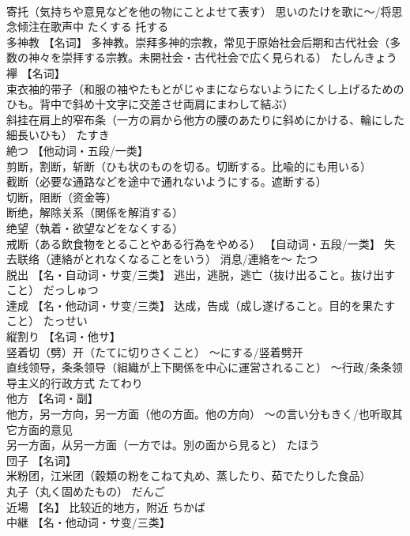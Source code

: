 \documentclass[8pt]{extreport}
\begin{document}
\begin{CJK}{UTF8}{min}
\\	寄托（気持ちや意見などを他の物にことよせて表す） 思いのたけを歌に～/将思念倾注在歌声中	たくする	托する
\\	多神教	【名词】 多神教。崇拜多神的宗教，常见于原始社会后期和古代社会（多数の神々を崇拝する宗教。未開社会・古代社会で広く見られる）	たしんきょう	
\\	襷	【名词】 
\\	束衣袖的带子（和服の袖やたもとがじゃまにならないようにたくし上げるためのひも。背中で斜め十文字に交差させ両肩にまわして結ぶ） 
\\	斜挂在肩上的窄布条（一方の肩から他方の腰のあたりに斜めにかける、輪にした細長いひも）	たすき	
\\	絶つ	【他动词・五段/一类】 
\\	剪断，割断，斩断（ひも状のものを切る。切断する。比喩的にも用いる） 
\\	截断（必要な通路などを途中で通れないようにする。遮断する） 
\\	切断，阻断（资金等） 
\\	断绝，解除关系（関係を解消する） 
\\	绝望（執着・欲望などをなくする） 
\\	戒断（ある飲食物をとることやある行為をやめる） 【自动词・五段/一类】 失去联络（連絡がとれなくなることをいう） 消息/連絡を～	たつ	
\\	脱出	【名・自动词・サ变/三类】 逃出，逃脱，逃亡（抜け出ること。抜け出すこと）	だっしゅつ	
\\	達成	【名・他动词・サ变/三类】 达成，告成（成し遂げること。目的を果たすこと）	たっせい	
\\	縦割り	【名词・他サ】 
\\	竖着切（劈）开（たてに切りさくこと） ～にする/竖着劈开 
\\	直线领导，条条领导（組織が上下関係を中心に運営されること） ～行政/条条领导主义的行政方式	たてわり	
\\	他方	【名词・副】 
\\	他方，另一方向，另一方面（他の方面。他の方向） ～の言い分もきく/也听取其它方面的意见 
\\	另一方面，从另一方面（一方では。別の面から見ると）	たほう	
\\	団子	【名词】 
\\	米粉团，江米团（穀類の粉をこねて丸め、蒸したり、茹でたりした食品） 
\\	丸子（丸く固めたもの）	だんご	
\\	近場	【名】 比较近的地方，附近	ちかば	
\\	中継	【名・他动词・サ变/三类】 

\end{CJK}
\end{document}
